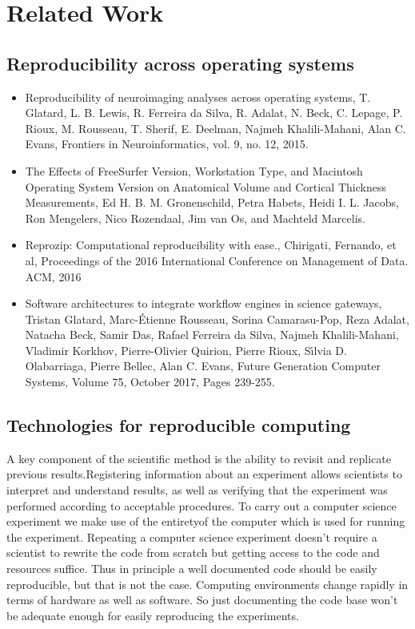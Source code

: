 \chapter{Related Work}

\section{Reproducibility across operating systems}
\begin{itemize}
 \item Reproducibility of neuroimaging analyses across operating systems, T. Glatard, L. B. Lewis, R. Ferreira da Silva, R. Adalat, N. Beck, C. Lepage, P. Rioux, M. Rousseau, T. Sherif, E. Deelman, Najmeh Khalili-Mahani, Alan C. Evans, Frontiers in Neuroinformatics, vol. 9, no. 12, 2015.
 \item The Effects of FreeSurfer Version, Workstation Type, and Macintosh Operating System Version on Anatomical Volume and Cortical Thickness Measurements, Ed H. B. M. Gronenschild, Petra Habets, Heidi I. L. Jacobs, Ron Mengelers, Nico Rozendaal, Jim van Os, and Machteld Marcelis.
 \item Reprozip: Computational reproducibility with ease., Chirigati, Fernando, et al, Proceedings of the 2016 International Conference on Management of Data. ACM, 2016
 \item Software architectures to integrate workflow engines in science gateways, Tristan Glatard, Marc-Étienne Rousseau, Sorina Camarasu-Pop, Reza Adalat, Natacha Beck, Samir Das, Rafael Ferreira da Silva, Najmeh Khalili-Mahani, Vladimir Korkhov, Pierre-Olivier Quirion, Pierre Rioux, Sı́lvia D. Olabarriaga, Pierre Bellec, Alan C. Evans, Future Generation Computer Systems, Volume 75, October 2017, Pages 239-255.
\end{itemize}

\section{Technologies for reproducible computing}
A key component of the scientific method is the ability to revisit and replicate previous results.Registering information about an experiment allows scientists to interpret and
understand results, as well as verifying that the experiment was performed according to acceptable procedures. To carry out a computer science experiment we make use of the entiretyof the computer which is used for running the experiment. Repeating a computer science experiment doesn't require a scientist to rewrite the code from scratch but getting access to the code and resources suffice. Thus in principle a well documented code should be easily reproducible, but that is not the case. Computing environments change rapidly in terms of hardware as well as software. So just documenting the code base won't be adequate enough for easily reproducing the experiments.

